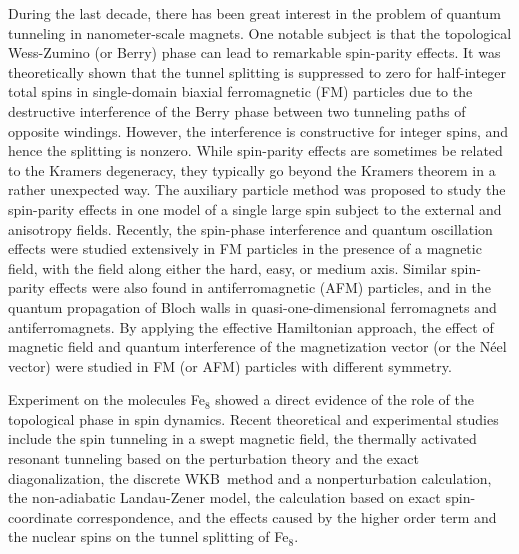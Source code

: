 During the last decade, there has been great interest in the problem of
quantum tunneling in nanometer-scale magnets.\cite{1} One notable subject is
that the topological Wess-Zumino (or Berry) phase\cite{2} can lead to
remarkable spin-parity effects.\cite{3,4,5,6,7,8,9,10,11,12,13,14,15} It was
theoretically shown that the tunnel splitting is suppressed to zero for
half-integer total spins in single-domain biaxial ferromagnetic (FM)
particles due to the destructive interference of the Berry phase between two
tunneling paths of opposite windings.\cite{3} However, the interference is
constructive for integer spins, and hence the splitting is nonzero. While
spin-parity effects are sometimes be related to the Kramers degeneracy, they
typically go beyond the Kramers theorem in a rather unexpected way.\cite{4,5}
The auxiliary particle method was proposed to study the spin-parity effects
in one model of a single large spin subject to the external and anisotropy
fields.\cite{6} Recently, the spin-phase interference and quantum
oscillation effects were studied extensively in FM particles in the presence
of a magnetic field, with the field along either the hard,\cite{4,7} easy,%
\cite{8} or medium axis.\cite{9} Similar spin-parity effects were also found
in antiferromagnetic (AFM) particles,\cite{10,11} and in the quantum
propagation of Bloch walls in quasi-one-dimensional ferromagnets\cite{12}
and antiferromagnets.\cite{13} By applying the effective Hamiltonian
approach, the effect of magnetic field and quantum interference of the
magnetization vector (or the N\'{e}el vector) were studied in FM (or AFM)
particles with different symmetry.\cite{14}

Experiment on the molecules Fe$_8$ showed a direct evidence of the role of
the topological phase in spin dynamics.\cite{15} Recent theoretical and
experimental studies include the spin tunneling in a swept magnetic field,%
\cite{16} the thermally activated resonant tunneling based on the
perturbation theory\cite{17} and the exact diagonalization,\cite{18} the
discrete WKB\ method and a nonperturbation calculation,\cite{19} the
non-adiabatic Landau-Zener model,\cite{20} the calculation based on exact
spin-coordinate correspondence,\cite{21} and the effects caused by the
higher order term and the nuclear spins on the tunnel splitting of Fe$_8$.%
\cite{22}

